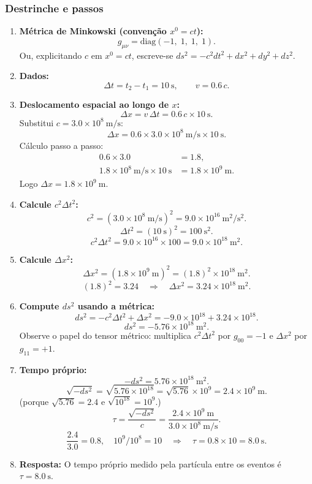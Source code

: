 \documentclass[11pt]{article}
\begin{document}
\subsubsection*{Destrinche e passos}
\begin{enumerate}
  \item \textbf{Métrica de Minkowski (convenção $x^0=ct$):}
  \[
    g_{\mu\nu} = \mathrm{diag}(-1,\;1,\;1,\;1).
  \]
  Ou, explicitando \(c\) em $x^0=ct$, escreve-se $ds^2 = -c^2dt^2 + dx^2 + dy^2 + dz^2$.
  \item \textbf{Dados:}
  \[
    \Delta t = t_2 - t_1 = 10\ \mathrm{s},\qquad v = 0.6\,c.
  \]
  \item \textbf{Deslocamento espacial ao longo de \(x\):}
  \[
    \Delta x = v\,\Delta t = 0.6\,c \times 10\ \mathrm{s}.
  \]
  Substitui \(c = 3.0\times 10^{8}\ \mathrm{m/s}\):
  \[
    \Delta x = 0.6 \times 3.0\times 10^{8}\ \mathrm{m/s} \times 10\ \mathrm{s}.
  \]
  Cálculo passo a passo:
  \begin{align*}
    0.6\times 3.0 &= 1.8,\\
    1.8\times 10^{8}\ \mathrm{m/s}\times 10\ \mathrm{s} &= 1.8\times 10^{9}\ \mathrm{m}.
  \end{align*}
  Logo \(\Delta x = 1.8\times 10^{9}\ \mathrm{m}.\)
  \item \textbf{Calcule \(c^2\Delta t^2\):}
  \[
    c^2 = (3.0\times 10^8\ \mathrm{m/s})^2 = 9.0\times 10^{16}\ \mathrm{m}^2\!/\mathrm{s}^2.
  \]
  \[
    \Delta t^2 = (10\ \mathrm{s})^2 = 100\ \mathrm{s}^2.
  \]
  \[
    c^2\Delta t^2 = 9.0\times 10^{16}\times 100 = 9.0\times 10^{18}\ \mathrm{m}^2.
  \]
  \item \textbf{Calcule \(\Delta x^2\):}
  \[
    \Delta x^2 = (1.8\times 10^{9}\ \mathrm{m})^2 = (1.8)^2\times 10^{18}\ \mathrm{m}^2.
  \]
  \[
    (1.8)^2 = 3.24 \quad\Rightarrow\quad \Delta x^2 = 3.24\times 10^{18}\ \mathrm{m}^2.
  \]
  \item \textbf{Compute \(ds^2\) usando a métrica:}
  \[
    ds^2 = -c^2\Delta t^2 + \Delta x^2 = -9.0\times 10^{18} + 3.24\times 10^{18}.
  \]
  \[
    ds^2 = -5.76\times 10^{18}\ \mathrm{m}^2.
  \]
  Observe o papel do tensor métrico: multiplica \(c^2\Delta t^2\) por \(g_{00}=-1\) e \(\Delta x^2\) por \(g_{11}=+1\).
  \item \textbf{Tempo próprio:}
  \[
    -ds^2 = 5.76\times 10^{18}\ \mathrm{m}^2.
  \]
  \[
    \sqrt{-ds^2} = \sqrt{5.76\times 10^{18}} = \sqrt{5.76}\times 10^9 = 2.4\times 10^9\ \mathrm{m}.
  \]
  (porque \(\sqrt{5.76}=2.4\) e \(\sqrt{10^{18}}=10^9\).)
  \[
    \tau = \frac{\sqrt{-ds^2}}{c} = \frac{2.4\times 10^9\ \mathrm{m}}{3.0\times 10^8\ \mathrm{m/s}}.
  \]
  \[
    \frac{2.4}{3.0} = 0.8,\quad 10^9/10^8 = 10 \quad\Rightarrow\quad \tau = 0.8\times 10 = 8.0\ \mathrm{s}.
  \]
  \item \textbf{Resposta:} O tempo próprio medido pela partícula entre os eventos é \(\boxed{\tau = 8.0\ \mathrm{s}}\).
\end{enumerate}
\end{document}

